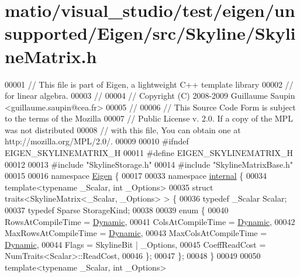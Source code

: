 \hypertarget{matio_2visual__studio_2test_2eigen_2unsupported_2_eigen_2src_2_skyline_2_skyline_matrix_8h_source}{}\section{matio/visual\+\_\+studio/test/eigen/unsupported/\+Eigen/src/\+Skyline/\+Skyline\+Matrix.h}
\label{matio_2visual__studio_2test_2eigen_2unsupported_2_eigen_2src_2_skyline_2_skyline_matrix_8h_source}

\begin{DoxyCode}
00001 \textcolor{comment}{// This file is part of Eigen, a lightweight C++ template library}
00002 \textcolor{comment}{// for linear algebra.}
00003 \textcolor{comment}{//}
00004 \textcolor{comment}{// Copyright (C) 2008-2009 Guillaume Saupin <guillaume.saupin@cea.fr>}
00005 \textcolor{comment}{//}
00006 \textcolor{comment}{// This Source Code Form is subject to the terms of the Mozilla}
00007 \textcolor{comment}{// Public License v. 2.0. If a copy of the MPL was not distributed}
00008 \textcolor{comment}{// with this file, You can obtain one at http://mozilla.org/MPL/2.0/.}
00009 
00010 \textcolor{preprocessor}{#ifndef EIGEN\_SKYLINEMATRIX\_H}
00011 \textcolor{preprocessor}{#define EIGEN\_SKYLINEMATRIX\_H}
00012 
00013 \textcolor{preprocessor}{#include "SkylineStorage.h"}
00014 \textcolor{preprocessor}{#include "SkylineMatrixBase.h"}
00015 
00016 \textcolor{keyword}{namespace }\hyperlink{namespace_eigen}{Eigen} \{ 
00017 
00033 \textcolor{keyword}{namespace }\hyperlink{namespaceinternal}{internal} \{
00034 \textcolor{keyword}{template}<\textcolor{keyword}{typename} \_Scalar, \textcolor{keywordtype}{int} \_Options>
00035 \textcolor{keyword}{struct }traits<SkylineMatrix<\_Scalar, \_Options> > \{
00036     \textcolor{keyword}{typedef} \_Scalar Scalar;
00037     \textcolor{keyword}{typedef} Sparse StorageKind;
00038 
00039     \textcolor{keyword}{enum} \{
00040         RowsAtCompileTime = \hyperlink{namespace_eigen_ad81fa7195215a0ce30017dfac309f0b2}{Dynamic},
00041         ColsAtCompileTime = \hyperlink{namespace_eigen_ad81fa7195215a0ce30017dfac309f0b2}{Dynamic},
00042         MaxRowsAtCompileTime = \hyperlink{namespace_eigen_ad81fa7195215a0ce30017dfac309f0b2}{Dynamic},
00043         MaxColsAtCompileTime = \hyperlink{namespace_eigen_ad81fa7195215a0ce30017dfac309f0b2}{Dynamic},
00044         Flags = SkylineBit | \_Options,
00045         CoeffReadCost = NumTraits<Scalar>::ReadCost,
00046     \};
00047 \};
00048 \}
00049 
00050 \textcolor{keyword}{template}<\textcolor{keyword}{typename} \_Scalar, \textcolor{keywordtype}{int} \_Options>

\end{DoxyCode}
